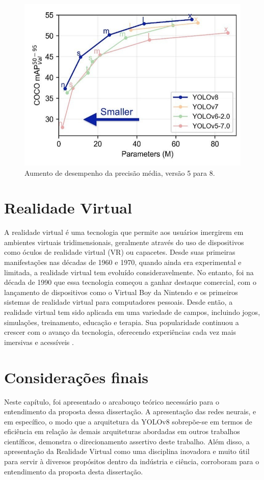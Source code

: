 \begin{figure}[!h]
    \center
    \begin{minipage}{0.9\linewidth}
    \center
    \captionsetup{justification=centering,margin=0.5cm,font=small}
    \includegraphics[width=0.7\linewidth]{img/cap2/precisao.png}
    \caption{ Aumento de desempenho da precisão média, versão 5 para 8.  \cite{ultralytics2023yolo}} \label{subfig:precisao}
    \end{minipage}
\end{figure}

\section{Realidade Virtual}
\label{sec:precisaorecall}

A realidade virtual é uma tecnologia que permite aos usuários imergirem em ambientes virtuais tridimensionais, geralmente através do uso de dispositivos como óculos de realidade virtual (VR) ou capacetes. Desde suas primeiras manifestações nas décadas de 1960 e 1970, quando ainda era experimental e limitada, a realidade virtual tem evoluído consideravelmente. No entanto, foi na década de 1990 que essa tecnologia começou a ganhar destaque comercial, com o lançamento de dispositivos como o Virtual Boy da Nintendo e os primeiros sistemas de realidade virtual para computadores pessoais. Desde então, a realidade virtual tem sido aplicada em uma variedade de campos, incluindo jogos, simulações, treinamento, educação e terapia. Sua popularidade continuou a crescer com o avanço da tecnologia, oferecendo experiências cada vez mais imersivas e acessíveis \cite{kirner2011evoluccao}.


\section{Considerações finais}

Neste capítulo, foi apresentado o arcabouço teórico necessário para o entendimento da proposta dessa dissertação. A apresentação das redes neurais, e em específico, o modo que a arquitetura da YOLOv8 sobrepõe-se em termos de eficiência em relação às demais arquiteturas abordadas em outros trabalhos científicos, demonstra o direcionamento assertivo deste trabalho. Além disso, a apresentação da Realidade Virtual como uma disciplina inovadora e muito útil para servir à diversos propósitos dentro da indústria e ciência, corroboram para o entendimento da proposta desta dissertação.